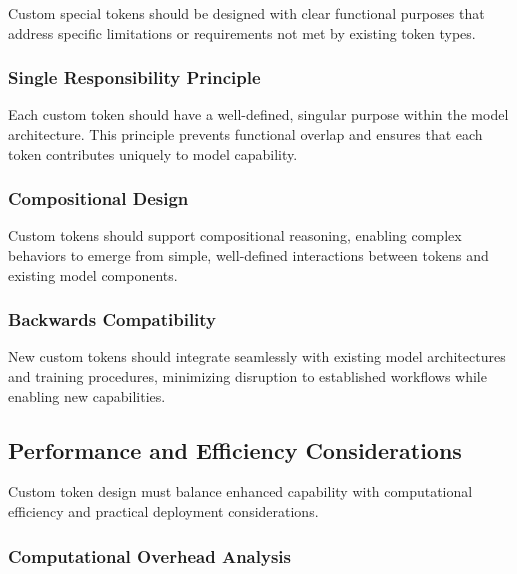 Custom special tokens should be designed with clear functional purposes that address specific limitations or requirements not met by existing token types.

\subsubsection{Single Responsibility Principle}

Each custom token should have a well-defined, singular purpose within the model architecture. This principle prevents functional overlap and ensures that each token contributes uniquely to model capability.
\begin{comment}
Feedback: A "do this, not that" example would be very effective here. For example: "DO: Create a `<QUESTION_START>` token for question answering and a separate `<SUMMARY_START>` token for summarization. DON'T: Create a single `<TASK_START>` token and expect the model to infer the task from the context. Giving each token a single, clear job makes the model's learning task easier and the resulting system more robust."
\end{comment}

\subsubsection{Compositional Design}

Custom tokens should support compositional reasoning, enabling complex behaviors to emerge from simple, well-defined interactions between tokens and existing model components.

\subsubsection{Backwards Compatibility}

New custom tokens should integrate seamlessly with existing model architectures and training procedures, minimizing disruption to established workflows while enabling new capabilities.

\subsection{Performance and Efficiency Considerations}

Custom token design must balance enhanced capability with computational efficiency and practical deployment considerations.

\subsubsection{Computational Overhead Analysis}

